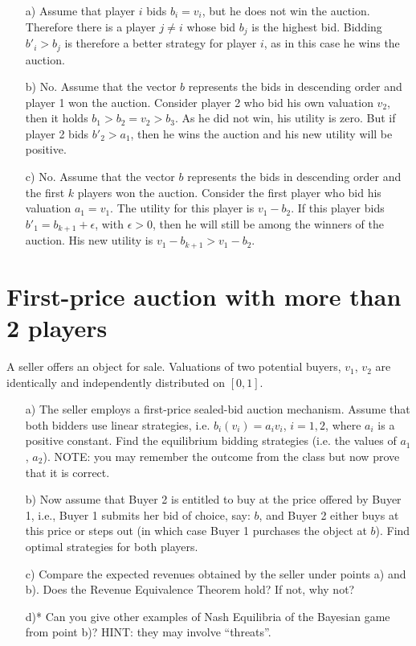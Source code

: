 \documentclass{../ape}
\begin{document}
\begin{solution}
  \begin{enumerate}
  \item[a)]
  Assume that player $i$ bids $b_i = v_i$, but he does not win the auction. Therefore there is a player $j \neq i$ whose bid $b_j$ is the highest bid. Bidding $b'_i > b_j$ is therefore a better strategy for player $i$, as in this case he wins the auction.
  \item[b)]
  No. Assume that the vector $b$ represents the bids in descending order and player 1 won the auction. Consider player 2 who bid his own valuation $v_2$, then it holds $b_1 > b_2 = v_2 > b_3$. As he did not win, his utility is zero. But if player 2 bids $b'_2 > a_1$, then he wins the auction and his new utility will be positive.
  \item[c)]
  No. Assume that the vector $b$ represents the bids in descending order and the first $k$ players won the auction. Consider the first player who bid his valuation $a_1 = v_1$. The utility for this player is $v_1-b_2$. If this player bids $b'_1 = b_{k+1} + \epsilon$, with $\epsilon > 0$, then he will still be among the winners of the auction. His new utility is $v_1-b_{k+1} > v_1-b_2$.
  \end{enumerate}
\end{solution}

\section{First-price auction with more than 2 players}

 A seller offers an object for sale. Valuations of two potential buyers, $v_1$, $v_2$ are identically and independently distributed on $[0,1]$.
\begin{enumerate}
\item[a)]
 The seller employs a first-price sealed-bid auction mechanism. Assume that both bidders use linear strategies, i.e. $b_i(v_i) = a_iv_i$, $i = 1, 2$, where $a_i$ is a positive constant. Find the equilibrium bidding strategies (i.e. the values of $a_1$, $a_2$). NOTE: you may remember the outcome from the class but now prove that it is correct.
\item[b)] Now assume that Buyer 2 is entitled to buy at the price offered by Buyer 1, i.e., Buyer 1 submits her bid of choice, say: $b$, and Buyer 2 either buys at this price or steps out (in which case Buyer 1 purchases the object at $b$). Find optimal strategies for both players.
\item[c)]  Compare the expected revenues obtained by the seller under points a) and b). Does the Revenue Equivalence Theorem hold? If not, why not?

\item[d)*] Can you give other examples of Nash Equilibria of the Bayesian game from point b)? HINT: they may involve ``threats''.
\end{enumerate}
\end{document}

